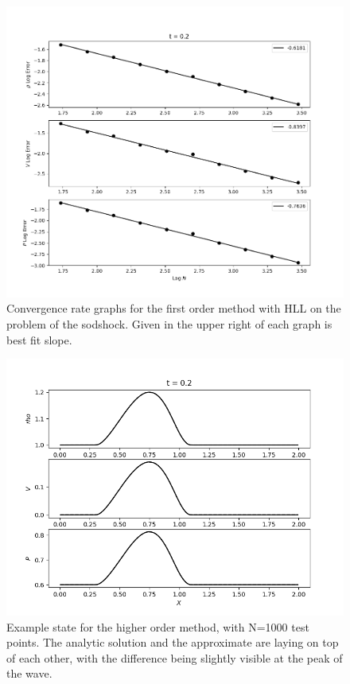 \documentclass{article}
\begin{document}
\begin{figure}[h]
    \includegraphics[width=\textwidth]{onedimerror.png}
    \caption{Convergence rate graphs for the first order method with HLL on the problem of the sodshock. Given in the upper right of each graph is best fit slope.}
    \label{fig:onedimconv}
\end{figure}

\begin{figure}[h]
    \includegraphics[width=\textwidth]{highorderex.png}
    \caption{Example state for the higher order method, with N=1000 test points. The analytic solution and the approximate are laying on top of each other, with the difference being slightly visible at the peak of the wave.}
    \label{fig:highordex}
\end{figure}
\end{document}
